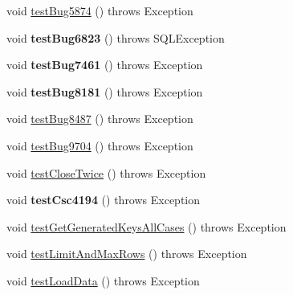 \begin{DoxyCompactItemize}
\item 
void \mbox{\hyperlink{classtestsuite_1_1regression_1_1_statement_regression_test_add450cdadfb025367a53db78024a96e6}{test\+Bug5874}} ()  throws Exception 
\item 
\mbox{\label{classtestsuite_1_1regression_1_1_statement_regression_test_a56e71fb8ad060f98fe506bef810726c9}} 
void {\bfseries test\+Bug6823} ()  throws S\+Q\+L\+Exception 
\item 
\mbox{\label{classtestsuite_1_1regression_1_1_statement_regression_test_a24e32a837cc4669fb18c820b720a2eb8}} 
void {\bfseries test\+Bug7461} ()  throws Exception 
\item 
\mbox{\label{classtestsuite_1_1regression_1_1_statement_regression_test_a41b595b0e3472289f1347ac10199f070}} 
void {\bfseries test\+Bug8181} ()  throws Exception 
\item 
void \mbox{\hyperlink{classtestsuite_1_1regression_1_1_statement_regression_test_af4aa8a9e2d17d0762f6a5f7fa2373595}{test\+Bug8487}} ()  throws Exception 
\item 
void \mbox{\hyperlink{classtestsuite_1_1regression_1_1_statement_regression_test_a5da35a1c85dea6e6eac135094859b6d2}{test\+Bug9704}} ()  throws Exception 
\item 
void \mbox{\hyperlink{classtestsuite_1_1regression_1_1_statement_regression_test_a4ee424820f3c751235f0082c64575f6a}{test\+Close\+Twice}} ()  throws Exception 
\item 
\mbox{\label{classtestsuite_1_1regression_1_1_statement_regression_test_a60a5a676acb160c9ad0bd9a19fd2da5d}} 
void {\bfseries test\+Csc4194} ()  throws Exception 
\item 
void \mbox{\hyperlink{classtestsuite_1_1regression_1_1_statement_regression_test_af835b8174710f92e6cd0e183a67e2594}{test\+Get\+Generated\+Keys\+All\+Cases}} ()  throws Exception 
\item 
void \mbox{\hyperlink{classtestsuite_1_1regression_1_1_statement_regression_test_ac68c2426cc03a647c5a752e6e2aa5914}{test\+Limit\+And\+Max\+Rows}} ()  throws Exception 
\item 
void \mbox{\hyperlink{classtestsuite_1_1regression_1_1_statement_regression_test_a242b1039d3f6713e99d7512cb905a999}{test\+Load\+Data}} ()  throws Exception 

\end{DoxyCompactItemize}
